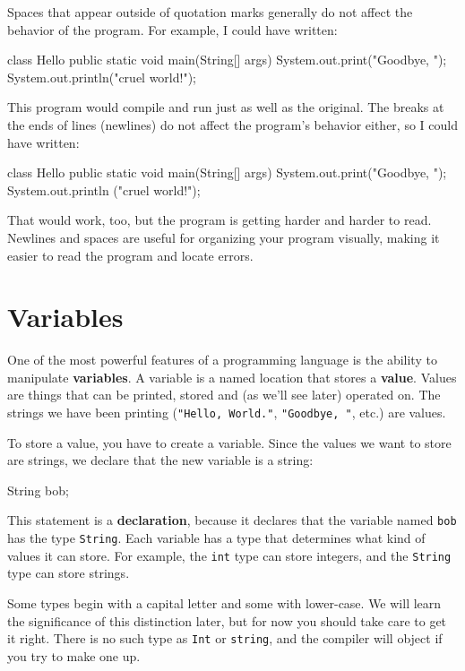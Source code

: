 Spaces that appear outside of quotation marks generally do
not affect the behavior of the program.  For example, I
could have written:

\begin{code}
class Hello {
public static void main(String[] args) {
System.out.print("Goodbye, ");
System.out.println("cruel world!");
}
}
\end{code}
%
This program would compile and run just as well as the original.
The breaks at the ends of lines (newlines) do not affect
the program's behavior either, so I could have written:

\begin{code}
class Hello { public static void main(String[] args) {
System.out.print("Goodbye, "); System.out.println
("cruel world!");}}
\end{code}
%
That would work, too, but
the program is getting harder and harder to read.  Newlines and
spaces are useful for organizing your program visually, making
it easier to read the program and locate errors.


\section {Variables}

One of the most powerful features of a programming language is the
ability to manipulate {\bf variables}.  A variable is a named location
that stores a {\bf value}.  Values are things that can be printed, stored
and (as we'll see later) operated on.  The strings we have been
printing ({\tt "Hello, World."}, {\tt "Goodbye, "}, etc.)  are values.

To store a value, you have to create a variable.  Since
the values we want to store are strings, we declare that
the new variable is a string:

\begin{code}
    String bob;
\end{code}
%
This statement is a {\bf declaration}, because it declares that the
variable named {\tt bob} has the type {\tt String}.  Each variable
has a type that determines what kind of values it can store.  For
example, the {\tt int} type can store integers, and the {\tt String}
type can store strings.


Some types begin with a capital letter and some
with lower-case.  We will learn the significance of this distinction
later, but for now you should take care to get it right.  There is no
such type as {\tt Int} or {\tt string}, and the compiler will object
if you try to make one up.

